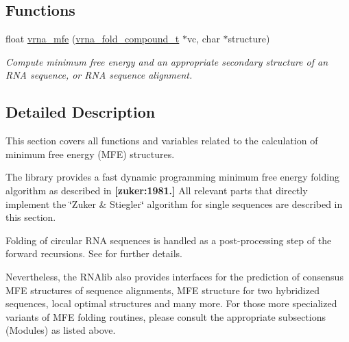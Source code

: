 \subsection*{Functions}
\begin{DoxyCompactItemize}
\item 
float \hyperlink{group__mfe__fold_gabd3b147371ccf25c577f88bbbaf159fd}{vrna\+\_\+mfe} (\hyperlink{group__fold__compound_ga1b0cef17fd40466cef5968eaeeff6166}{vrna\+\_\+fold\+\_\+compound\+\_\+t} $\ast$vc, char $\ast$structure)
\begin{DoxyCompactList}\small\item\em Compute minimum free energy and an appropriate secondary structure of an R\+N\+A sequence, or R\+N\+A sequence alignment. \end{DoxyCompactList}\end{DoxyCompactItemize}


\subsection{Detailed Description}
This section covers all functions and variables related to the calculation of minimum free energy (M\+F\+E) structures. 

The library provides a fast dynamic programming minimum free energy folding algorithm as described in {\bfseries [zuker\+:1981.]} All relevant parts that directly implement the \char`\"{}\+Zuker \& Stiegler\char`\"{} algorithm for single sequences are described in this section.

Folding of circular R\+N\+A sequences is handled as a post-\/processing step of the forward recursions. See \cite{hofacker:2006} for further details.

Nevertheless, the R\+N\+Alib also provides interfaces for the prediction of consensus M\+F\+E structures of sequence alignments, M\+F\+E structure for two hybridized sequences, local optimal structures and many more. For those more specialized variants of M\+F\+E folding routines, please consult the appropriate subsections (Modules) as listed above. 

